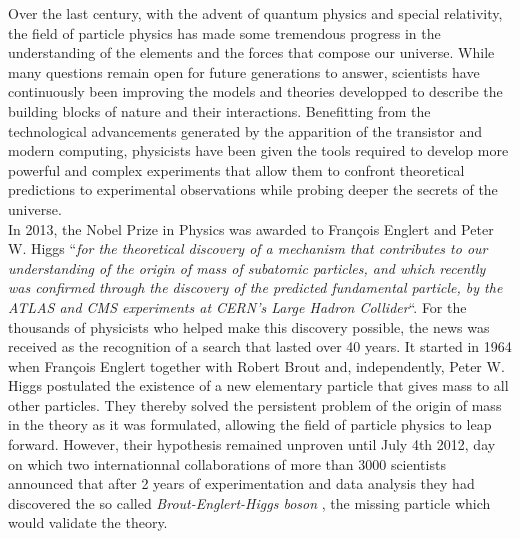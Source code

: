 Over the last century, with the advent of quantum physics and special relativity, the field of particle physics has made some tremendous progress in the understanding of the elements and the forces that compose our universe. While many questions remain open for future generations to answer, scientists have continuously been improving the models and theories developped to describe the building blocks of nature and their interactions. Benefitting from the technological advancements generated by the apparition of the transistor and modern computing, physicists have been given the tools required to develop more powerful and complex experiments that allow them to confront theoretical predictions to experimental observations while probing deeper the secrets of the universe. \\

In 2013, the Nobel Prize in Physics was awarded to Fran\c{c}ois Englert and Peter W. Higgs ``\textit{for the theoretical discovery of a mechanism that contributes to our understanding of the origin of mass of subatomic particles, and which recently was confirmed through the discovery of the predicted fundamental particle, by the ATLAS and CMS experiments at CERN's Large Hadron Collider}``. For the thousands of physicists who helped make this discovery possible, the news was received as the recognition of a search that lasted over 40 years. It started in 1964 when Fran\c{c}ois Englert together with Robert Brout \cite{PhysRevLett.13.321} and, independently, Peter W. Higgs \cite{PhysRevLett.13.508} postulated the existence of a new elementary particle that gives mass to all other particles. They thereby solved the persistent problem of the origin of mass in the theory as it was formulated, allowing the field of particle physics to leap forward.  However, their hypothesis remained unproven until July 4th 2012, day on which two internationnal collaborations of more than 3000 scientists announced that after 2 years of experimentation and data analysis they had discovered the so called \textit{Brout-Englert-Higgs boson} \cite{PhysRevLett.114.191803}, the missing particle which would validate the theory. \\

